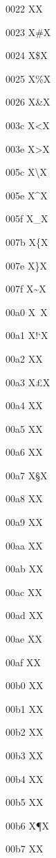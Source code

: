 \documentclass[11pt]{article}
\begin{document}
\renewcommand{\|}{} %
\newcommand{\G}{} %
\newcommand{\U}{} %
\newcommand{\h}{} %
\newcommand{\OHORN}{} %
\newcommand{\ohorn}{} %
\newcommand{\UHORN}{} %
\newcommand{\uhorn}{} %
\newcommand{\textsubbreve}{} %
\newcommand{\cb}{} %
0022 X{\textquotedbl}X

0023 X{\#{}}X

0024 X{\${}}X

0025 X{\%{}}X

0026 X{\&{}}X

003c X{\textless}X

003e X{\textgreater}X

005c X{\textbackslash}X

005e X{\^{}}X

005f X{\_{}}X

007b X{\{{}}X

007e X{\}{}}X

007f X{\~{}}X

00a0 X{~}X

00a1 X{!`}X

00a2 X{\textcent}X

00a3 X{\pounds}X

00a4 X{\textcurrency}X

00a5 X{\textyen}X

00a6 X{\textbrokenbar}X

00a7 X{\S{}}X

00a8 X{\textasciidieresis}X

00a9 X{\textcopyright}X

00aa X{\textordfeminine}X

00ab X{\guillemotleft}X

00ac X{\textlnot}X

00ad X{\-{}}X

00ae X{\textregistered}X

00af X{\textasciimacron}X

00b0 X{\textdegree}X

00b1 X{\textpm}X

00b2 X{\texttwosuperior}X

00b3 X{\textthreesuperior}X

00b4 X{\textasciiacute}X

00b5 X{\textmu}X

00b6 X{\P{}}X

00b7 X{\textperiodcentered}X
\end{document}
